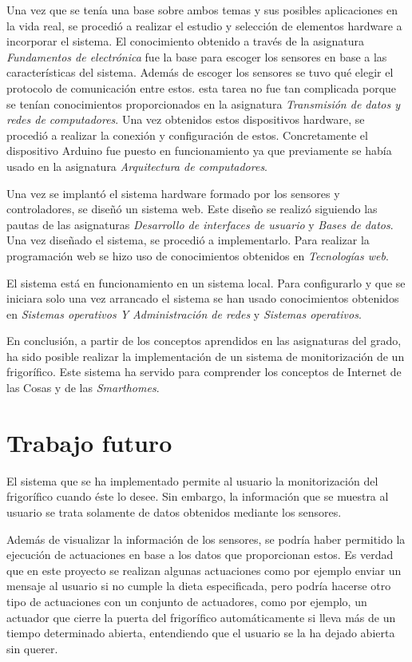 Una vez que se tenía una base sobre ambos temas y sus posibles aplicaciones en la vida real, se procedió a realizar el estudio y selección de elementos hardware a incorporar el sistema. El conocimiento obtenido a través de la asignatura \textit{Fundamentos de electrónica} fue la base para escoger los sensores en base a las características del sistema. Además de escoger los sensores se tuvo qué elegir el protocolo de comunicación entre estos. esta tarea no fue tan complicada porque se tenían conocimientos proporcionados en la asignatura \textit{Transmisión de datos y redes de computadores}. Una vez obtenidos estos dispositivos hardware, se procedió a realizar la conexión y configuración de estos. Concretamente el dispositivo Arduino fue puesto en funcionamiento ya que previamente se había usado en la asignatura \textit{Arquitectura de computadores}.

Una vez se implantó el sistema hardware formado por los sensores y controladores, se diseñó un sistema web. Este diseño se realizó siguiendo las pautas de las asignaturas \textit{Desarrollo de interfaces de usuario} y \textit{Bases de datos}. Una vez diseñado el sistema, se procedió a implementarlo. Para realizar la programación web se hizo uso de conocimientos obtenidos en \textit{Tecnologías web}.

El sistema está en funcionamiento en un sistema local. Para configurarlo y que se iniciara solo una vez arrancado el sistema se han usado conocimientos obtenidos en \textit{Sistemas operativos Y Administración de redes} y \textit{Sistemas operativos}.

En conclusión, a partir de los conceptos aprendidos en las asignaturas del grado, ha sido posible realizar la implementación de un sistema de monitorización de un frigorífico. Este sistema ha servido para comprender los conceptos de Internet de las Cosas y de las \textit{Smarthomes}.

\section{Trabajo futuro}
El sistema que se ha implementado permite al usuario la monitorización del frigorífico cuando éste lo desee. Sin embargo, la información que se muestra al usuario se trata solamente de datos obtenidos mediante los sensores.

Además de visualizar la información de los sensores, se podría haber permitido la ejecución de actuaciones en base a los datos que proporcionan estos. Es verdad que en este proyecto se realizan algunas actuaciones como por ejemplo enviar un mensaje al usuario si no cumple la dieta especificada, pero podría hacerse otro tipo de actuaciones con un conjunto de actuadores, como por ejemplo, un actuador que cierre la puerta del frigorífico automáticamente si lleva más de un tiempo determinado abierta, entendiendo que el usuario se la ha dejado abierta sin querer.

